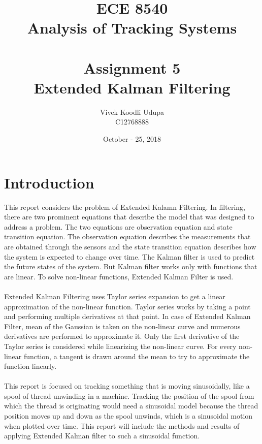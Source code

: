 \documentclass[12pt]{article}
\title{ECE 8540 \\ Analysis of Tracking Systems \\ \quad \\
	Assignment 5 \\ Extended Kalman Filtering}
\author{Vivek Koodli Udupa \\ C12768888}
\date{October - 25, 2018 }
\begin{document}
\begin{mdframed}
\maketitle
\end{mdframed}


\section{Introduction}
This report considers the problem of Extended Kalamn Filtering. In filtering, there are two prominent equations that describe the model that was designed to address a problem. The two equations are observation equation and state transition equation. The observation equation describes the measurements that are obtained through the sensors and the state transition equation describes how the system is expected to change over time. The Kalman filter is used to predict the future states of the system. But Kalman filter works only with functions that are linear. To solve non-linear functions, Extended Kalman Filter is used. \\ 
\\ \indent
Extended Kalman Filtering uses Taylor series expansion to get a linear approximation of the non-linear function. Taylor series works by taking a point and performing multiple derivatives at that point. In case of Extended Kalman Filter, mean of the Gaussian is taken on the non-linear curve and numerous derivatives are performed to approximate it. Only the first derivative of the Taylor series is considered while linearizing the non-linear curve. For every non-linear function, a tangent is drawn around the mean to try to approximate the function linearly. \\ 
\\ \indent
This report is focused on tracking something that is moving sinusoidally, like a spool of thread unwinding in a machine. Tracking the position of the spool from which the thread is originating would need a sinusoidal model because the thread position moves up and down as the spool unwinds, which is a sinusoidal motion when plotted over time. This report will include the methods and results of applying Extended Kalman filter to such a sinusoidal function.
\end{document}
